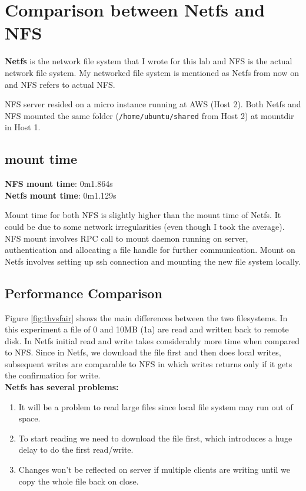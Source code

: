 \documentclass[10pt] {article}
\begin{document}
\section{Comparison between Netfs and NFS}
\textbf{Netfs} is the network file system that I wrote for this lab and NFS is the actual network file system. My networked file system is mentioned as Netfs from now on and NFS refers to actual NFS. 

NFS server resided on a micro instance running at AWS (Host 2). Both Netfs and NFS mounted the same folder (\texttt{/home/ubuntu/shared} from Host 2) at mountdir in Host 1.

\subsection {mount time}
\textbf{NFS mount time}: 0m1.864s \\
\textbf{Netfs mount time}: 0m1.129s

Mount time for both NFS is slightly higher than the mount time of Netfs. It could be due to some network irregularities (even though I took the average). NFS mount involves RPC call to mount daemon running on server, authentication and allocating a file handle for further communication. Mount on Netfs involves setting up ssh connection and mounting the new file system locally.

\subsection {Performance Comparison}

Figure \ref{fig:thvsfair} shows the main differences between the two filesystems. In this experiment a file of 0 and 10MB (1a) are read and written back to remote disk. In Netfs initial read and write takes considerably more time when compared to NFS. Since in Netfs, we download the file first and then does local writes, subsequent writes are comparable to NFS in which writes returns only if it gets the confirmation for write. \\

\textbf{Netfs has several problems:} \\

\begin{enumerate}
  \item It will be a problem to read large files since local file system may run out of space.
  \item To start reading we need to download the file first, which introduces a huge delay to do the first read/write. 
  \item Changes won't be reflected on server if multiple clients are writing until we copy the whole file back on close.
\end{enumerate}
\end{document}
